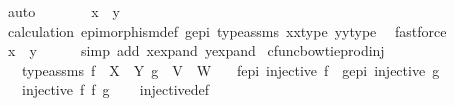 \begin{isabellebody}
\ auto\isanewline
\ \ \ \ \isamarkupfalse%
\ \isamarkupfalse%
\ {\isachardoublequoteopen}x{}\ {\isacharequal}{\kern0pt}\ y{}{\isachardoublequoteclose}\isanewline
\ \ \ \ \ \ \isamarkupfalse%
\ calculation\ epimorphism{\isacharunderscore}{\kern0pt}def{}\ g{\isacharunderscore}{\kern0pt}epi\ type{\isacharunderscore}{\kern0pt}assms{\isacharparenleft}{\kern0pt}{}{\isacharparenright}{\kern0pt}\ x{}{\isacharunderscore}{\kern0pt}x{}{\isacharunderscore}{\kern0pt}type{\isacharparenleft}{\kern0pt}{}{\isacharparenright}{\kern0pt}\ y{}{\isacharunderscore}{\kern0pt}y{}{\isacharunderscore}{\kern0pt}type{\isacharparenleft}{\kern0pt}{}{\isacharparenright}{\kern0pt}\ \isamarkupfalse%
\ fastforce\isanewline
\ \ \isamarkupfalse%
\isanewline
\ \ \isamarkupfalse%
\ \isamarkupfalse%
\ {\isachardoublequoteopen}x\ {\isacharequal}{\kern0pt}\ y{\isachardoublequoteclose}\isanewline
\ \ \ \ \isamarkupfalse%
\ {\isacharparenleft}{\kern0pt}simp\ add{\isacharcolon}{\kern0pt}\ x{\isacharunderscore}{\kern0pt}expand\ y{\isacharunderscore}{\kern0pt}expand{\isacharparenright}{\kern0pt}\isanewline
{}\isamarkupfalse%
%
\endisatagproof
{\isafoldproof}%
%
\isadelimproof
\isanewline
%
\endisadelimproof
\isanewline
{}\isamarkupfalse%
\ cfunc{\isacharunderscore}{\kern0pt}bowtieprod{\isacharunderscore}{\kern0pt}inj{\isacharcolon}{\kern0pt}\isanewline
\ \ \ type{\isacharunderscore}{\kern0pt}assms{\isacharcolon}{\kern0pt}\ {\isachardoublequoteopen}f\ {\isacharcolon}{\kern0pt}\ X\ {\isasymrightarrow}\ Y{\isachardoublequoteclose}\ {\isachardoublequoteopen}g\ {\isacharcolon}{\kern0pt}\ V\ {\isasymrightarrow}\ W{\isachardoublequoteclose}\isanewline
\ \ \ f{\isacharunderscore}{\kern0pt}epi{\isacharcolon}{\kern0pt}\ {\isachardoublequoteopen}injective\ f{\isachardoublequoteclose}\ \ g{\isacharunderscore}{\kern0pt}epi{\isacharcolon}{\kern0pt}\ {\isachardoublequoteopen}injective\ g{\isachardoublequoteclose}\isanewline
\ \ \ {\isachardoublequoteopen}injective\ {\isacharparenleft}{\kern0pt}f\ {\isasymbowtie}\isactrlsub f\ g{\isacharparenright}{\kern0pt}{\isachardoublequoteclose}\isanewline
%
\isadelimproof
\ \ %
\endisadelimproof
%
\isatagproof
{}\isamarkupfalse%
\ injective{\isacharunderscore}{\kern0pt}def\isanewline
{}\isamarkupfalse%

\end{isabellebody}
